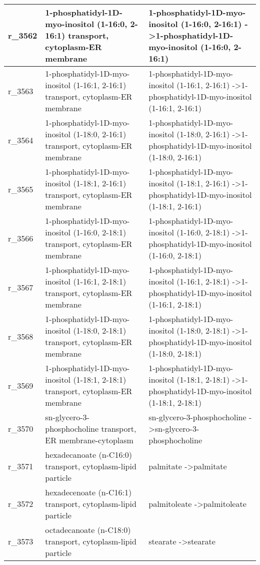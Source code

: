 \begin{landscape}
{\begin{longtable}{|l|p{7cm}|p{15cm}|}
r\_3562 & 1-phosphatidyl-1D-myo-inositol (1-16:0, 2-16:1) transport, cytoplasm-ER membrane & 1-phosphatidyl-1D-myo-inositol (1-16:0, 2-16:1)  -\textgreater 1-phosphatidyl-1D-myo-inositol (1-16:0, 2-16:1) \\ \hline
r\_3563 & 1-phosphatidyl-1D-myo-inositol (1-16:1, 2-16:1) transport, cytoplasm-ER membrane & 1-phosphatidyl-1D-myo-inositol (1-16:1, 2-16:1)  -\textgreater 1-phosphatidyl-1D-myo-inositol (1-16:1, 2-16:1) \\ \hline
r\_3564 & 1-phosphatidyl-1D-myo-inositol (1-18:0, 2-16:1) transport, cytoplasm-ER membrane & 1-phosphatidyl-1D-myo-inositol (1-18:0, 2-16:1)  -\textgreater 1-phosphatidyl-1D-myo-inositol (1-18:0, 2-16:1) \\ \hline
r\_3565 & 1-phosphatidyl-1D-myo-inositol (1-18:1, 2-16:1) transport, cytoplasm-ER membrane & 1-phosphatidyl-1D-myo-inositol (1-18:1, 2-16:1)  -\textgreater 1-phosphatidyl-1D-myo-inositol (1-18:1, 2-16:1) \\ \hline
r\_3566 & 1-phosphatidyl-1D-myo-inositol (1-16:0, 2-18:1) transport, cytoplasm-ER membrane & 1-phosphatidyl-1D-myo-inositol (1-16:0, 2-18:1)  -\textgreater 1-phosphatidyl-1D-myo-inositol (1-16:0, 2-18:1) \\ \hline
r\_3567 & 1-phosphatidyl-1D-myo-inositol (1-16:1, 2-18:1) transport, cytoplasm-ER membrane & 1-phosphatidyl-1D-myo-inositol (1-16:1, 2-18:1)  -\textgreater 1-phosphatidyl-1D-myo-inositol (1-16:1, 2-18:1) \\ \hline
r\_3568 & 1-phosphatidyl-1D-myo-inositol (1-18:0, 2-18:1) transport, cytoplasm-ER membrane & 1-phosphatidyl-1D-myo-inositol (1-18:0, 2-18:1)  -\textgreater 1-phosphatidyl-1D-myo-inositol (1-18:0, 2-18:1) \\ \hline
r\_3569 & 1-phosphatidyl-1D-myo-inositol (1-18:1, 2-18:1) transport, cytoplasm-ER membrane & 1-phosphatidyl-1D-myo-inositol (1-18:1, 2-18:1)  -\textgreater 1-phosphatidyl-1D-myo-inositol (1-18:1, 2-18:1) \\ \hline
r\_3570 & sn-glycero-3-phosphocholine transport, ER membrane-cytoplasm & sn-glycero-3-phosphocholine  -\textgreater sn-glycero-3-phosphocholine \\ \hline
r\_3571 & hexadecanoate (n-C16:0) transport, cytoplasm-lipid particle & palmitate  -\textgreater palmitate \\ \hline
r\_3572 & hexadecenoate (n-C16:1) transport, cytoplasm-lipid particle & palmitoleate  -\textgreater palmitoleate \\ \hline
r\_3573 & octadecanoate (n-C18:0) transport, cytoplasm-lipid particle & stearate  -\textgreater stearate \\ \hline

\end{longtable}}
\end{landscape}
